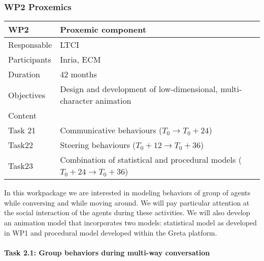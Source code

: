 
\subsubsection{WP2 Proxemics}


\begin{center}
\begin{tabular}{|l|l|}\hline
WP2 &  Proxemic component \\\hline
Responsable &  LTCI  \\\hline
Participants &  Inria, ECM\\\hline
Duration  &   42 months \\\hline
Objectives &  Design and development of low-dimensional, multi-character  animation \\\hline
Content &  \\\hline
Task 21 & Communicative behaviours   ($T_0 \rightarrow  T_0+24$)\\\hline
Task22 &  Steering behaviours  ($T_0+12 \rightarrow  T_0+36$) \\\hline
Task23 &  Combination of statistical and procedural models    ($T_0 +24 \rightarrow  T_0+36$) \\\hline
\end{tabular}
\end{center}

In this workpackage we are interested in modeling behaviors of group of agents while conversing and while moving around. We will pay particular attention at the social interaction of the agents during these activities. We will also develop an animation model that incorporates two models: statistical model as developed in WP1 and procedural model developed within the Greta platform.


\paragraph{Task 2.1: Group behaviors during multi-way conversation}


